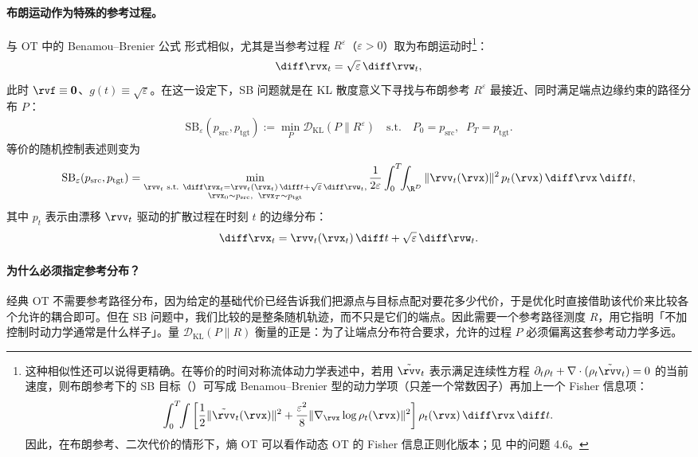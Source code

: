 \paragraph{布朗运动作为特殊的参考过程。}
 与 OT 中的 Benamou--Brenier 公式  形式相似，尤其是当参考过程
$R^\varepsilon$（$\varepsilon>0$）取为布朗运动时\footnote{这种相似性还可以说得更精确。在等价的时间对称流体动力学表述中，若用 $\tilde{\rvv}_t$ 表示满足连续性方程
$\partial_t \rho_t + \nabla \cdot (\rho_t \tilde{\rvv}_t)=0$ 的当前速度，则布朗参考下的 SB 目标（）可写成 Benamou--Brenier 型的动力学项（只差一个常数因子）再加上一个 Fisher 信息项：
\[
\int_0^T\!\!\int
\left[
\frac{1}{2}\|\tilde{\rvv}_t(\rvx)\|^2
+
\frac{\varepsilon^2}{8}\|\nabla_{\rvx}\log \rho_t(\rvx)\|^2
\right]\rho_t(\rvx)\,\diff\rvx\,\diff t.
\]
因此，在布朗参考、二次代价的情形下，熵 OT 可以看作动态 OT 的 Fisher 信息正则化版本；见 \citet{chen2021stochastic} 中的问题 4.6。}：
\[
\diff \rvx_t = \sqrt{\varepsilon}\,\diff\rvw_t,
\]
此时 $\rvf \equiv \mathbf{0}$、$g(t) \equiv \sqrt{\varepsilon}$。在这一设定下，SB 问题就是在 KL 散度意义下寻找与布朗参考 $R^\varepsilon$ 最接近、同时满足端点边缘约束的路径分布 $P$：
\begin{align}\label{eq:sb-epsilon}
    \mathrm{SB}_\varepsilon(p_{\mathrm{src}}, p_{\mathrm{tgt}})
    := \min_{P} \mathcal{D}_{\mathrm{KL}}(P \| R^\varepsilon)
    \quad \text{s.t.} \quad P_0 = p_{\mathrm{src}}, \;\; P_T = p_{\mathrm{tgt}}.
\end{align}
等价的随机控制表述则变为
\begin{align}\label{eq:sb-epsilon-kinetic}
\begin{aligned}
    \mathrm{SB}_\varepsilon(p_{\mathrm{src}}, p_{\mathrm{tgt}})
    = \min_{\substack{
        \rvv_t \text{ s.t. } \diff \rvx_t = \rvv_t(\rvx_t)\,\diff t + \sqrt{\varepsilon}\,\diff \rvw_t, \\
        \rvx_0 \sim p_{\mathrm{src}},\;\; \rvx_T \sim p_{\mathrm{tgt}}
    }}
    \frac{1}{2\varepsilon}\int_0^T \!\!\int_{\R^D}
        \|\rvv_t(\rvx)\|^2 \, p_t(\rvx)\,\diff \rvx\,\diff t,
\end{aligned}
\end{align}
其中 $p_t$ 表示由漂移 $\rvv_t$ 驱动的扩散过程在时刻 $t$ 的边缘分布：
\[
\diff \rvx_t = \rvv_t(\rvx_t)\,\diff t + \sqrt{\varepsilon}\,\diff \rvw_t.
\]


\paragraph{为什么必须指定参考分布？}
经典 OT 不需要参考路径分布，因为给定的基础代价已经告诉我们把源点与目标点配对要花多少代价，于是优化时直接借助该代价来比较各个允许的耦合即可。但在 SB 问题中，我们比较的是整条随机轨迹，而不只是它们的端点。因此需要一个参考路径测度 $R$，用它指明「不加控制时动力学通常是什么样子」。量
$\mathcal{D}_{\mathrm{KL}}(P\|R)$ 衡量的正是：为了让端点分布符合要求，允许的过程
$P$ 必须偏离这套参考动力学多远。


